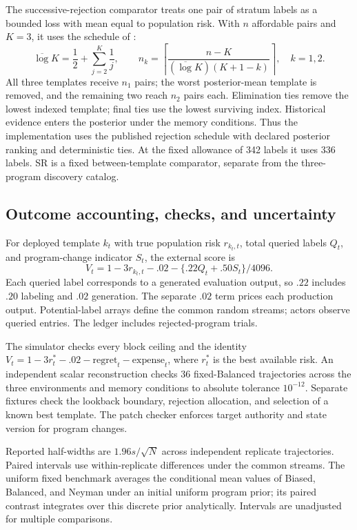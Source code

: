 The successive-rejection comparator treats one pair of stratum labels as a bounded loss with mean equal to population risk. With $n$ affordable pairs and $K=3$, it uses the schedule of \citet{bai}:
\begin{equation}
\overline{\log}K=\frac12+\sum_{j=2}^{K}\frac1j,\qquad
n_k=\left\lceil\frac{n-K}{(\overline{\log}K)(K+1-k)}\right\rceil,\quad k=1,2.
\end{equation}
All three templates receive $n_1$ pairs; the worst posterior-mean template is removed, and the remaining two reach $n_2$ pairs each. Elimination ties remove the lowest indexed template; final ties use the lowest surviving index. Historical evidence enters the posterior under the memory conditions. Thus the implementation uses the published rejection schedule with declared posterior ranking and deterministic ties. At the fixed allowance of 342 labels it uses 336 labels. SR is a fixed between-template comparator, separate from the three-program discovery catalog.

\subsection{Outcome accounting, checks, and uncertainty}
For deployed template $k_t$ with true population risk $r_{k_t,t}$, total queried labels $Q_t$, and program-change indicator $S_t$, the external score is
\begin{equation}
V_t=1-3r_{k_t,t}-.02-\{.22Q_t+.50S_t\}/4096.
\label{eq:net}
\end{equation}
Each queried label corresponds to a generated evaluation output, so $.22$ includes $.20$ labeling and $.02$ generation. The separate $.02$ term prices each production output. Potential-label arrays define the common random streams; actors observe queried entries. The ledger includes rejected-program trials.

The simulator checks every block ceiling and the identity
$V_t=1-3r_t^*-.02-\mathrm{regret}_t-\mathrm{expense}_t$,
where $r_t^*$ is the best available risk. An independent scalar reconstruction checks 36 fixed-Balanced trajectories across the three environments and memory conditions to absolute tolerance $10^{-12}$. Separate fixtures check the lookback boundary, rejection allocation, and selection of a known best template. The patch checker enforces target authority and state version for program changes.

Reported half-widths are $1.96s/\sqrt N$ across independent replicate trajectories. Paired intervals use within-replicate differences under the common streams. The uniform fixed benchmark averages the conditional mean values of Biased, Balanced, and Neyman under an initial uniform program prior; its paired contrast integrates over this discrete prior analytically. Intervals are unadjusted for multiple comparisons.


